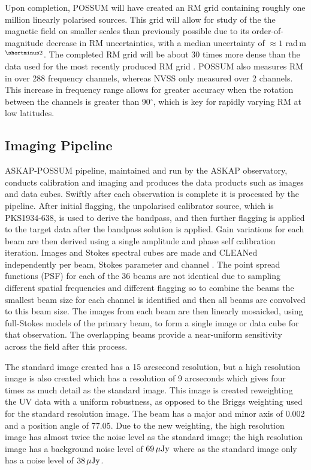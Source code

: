 Upon completion, POSSUM will have created an RM grid containing roughly one million linearly polarised sources. This grid will allow for study of the the magnetic field on smaller scales than previously possible due to its order-of-magnitude decrease in RM uncertainties, with a median uncertainty of $\approx 1$ rad$\,$m$^{\shortminus2}$. The completed RM grid will be about 30 times more dense than the data used for the most recently produced RM grid \cite{Hutschenreuter_2020}. POSSUM also measures RM in over 288 frequency channels, whereas NVSS only measured over 2 channels. This increase in frequency range allows for greater accuracy when the rotation between the channels is greater than 90$^\circ$, which is key for rapidly varying RM at low latitudes.

\subsection{Imaging Pipeline}


ASKAP-POSSUM pipeline, maintained and run by the ASKAP observatory, conducts calibration and imaging and produces the data products such as images and data cubes. Swiftly after each observation is complete it is processed by the pipeline. After initial flagging, the unpolarised calibrator source, which is PKS1934-638, is used to derive the bandpass, and then further flagging is applied to the target data after the bandpass solution is applied. Gain variations for each beam are then derived using a single amplitude and phase self calibration iteration. Images and Stokes spectral cubes are made and CLEANed independently per beam, Stokes parameter and channel \cite{Heald_2009}. The point spread functions (PSF) for each of the 36 beams are not identical due to sampling different spatial frequencies and different flagging so to combine the beams the smallest beam size for each channel is identified and then all beams are convolved to this beam size. The images from each beam are then linearly mosaicked, using full-Stokes models of the primary beam, to form a single image or data cube for that observation. The overlapping beams provide a near-uniform sensitivity across the field after this process. 

The standard image created has a 15 arcsecond resolution, but a high resolution image is also created which has a resolution of 9 arcseconds which gives four times as much detail as the standard image. This image is created reweighting the UV data with a uniform robustness, as opposed to the Briggs weighting used for the standard resolution image. The beam has a major and minor axis of 0.002 and a position angle of 77.05. Due to the new weighting, the high resolution image has almost twice the noise level as the standard image;  the high resolution image has a background noise level of $69\, \mu {\rm Jy}$ where as the standard image only has a noise level of $38 \, \mu {\rm Jy}$.

